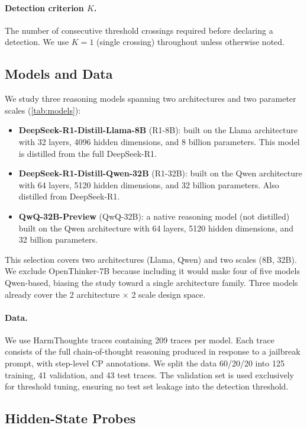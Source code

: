 \paragraph{Detection criterion $K$.} The number of consecutive threshold crossings required before declaring a detection. We use $K=1$ (single crossing) throughout unless otherwise noted.

\subsection{Models and Data}
\label{sec:models-data}

We study three reasoning models spanning two architectures and two parameter scales (\cref{tab:models}):

\begin{itemize}
    \item \textbf{DeepSeek-R1-Distill-Llama-8B} (R1-8B): built on the Llama architecture with 32 layers, 4096 hidden dimensions, and 8 billion parameters. This model is distilled from the full DeepSeek-R1.
    \item \textbf{DeepSeek-R1-Distill-Qwen-32B} (R1-32B): built on the Qwen architecture with 64 layers, 5120 hidden dimensions, and 32 billion parameters. Also distilled from DeepSeek-R1.
    \item \textbf{QwQ-32B-Preview} (QwQ-32B): a native reasoning model (not distilled) built on the Qwen architecture with 64 layers, 5120 hidden dimensions, and 32 billion parameters.
\end{itemize}

This selection covers two architectures (Llama, Qwen) and two scales (8B, 32B). We exclude OpenThinker-7B because including it would make four of five models Qwen-based, biasing the study toward a single architecture family. Three models already cover the 2 architecture $\times$ 2 scale design space.

\paragraph{Data.} We use HarmThoughts traces containing 209 traces per model. Each trace consists of the full chain-of-thought reasoning produced in response to a jailbreak prompt, with step-level CP annotations. We split the data 60/20/20 into 125 training, 41 validation, and 43 test traces. The validation set is used exclusively for threshold tuning, ensuring no test set leakage into the detection threshold.

\subsection{Hidden-State Probes}
\label{sec:hs-probes}

